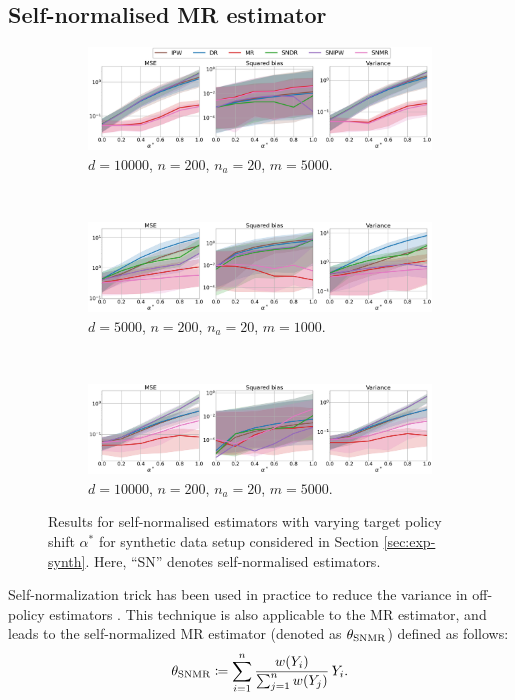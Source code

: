 \subsection{Self-normalised MR estimator}
\begin{figure}[ht]
     \centering
    \begin{subfigure}[b]{0.75\textwidth}
         \centering
         \includegraphics[width=\textwidth]{figures/mr/rebuttal/self-norm1.png}
         \caption{$d=10000$, $n = 200$, $n_a = 20$, $m = 5000$.}
         \label{fig:self-norma}
     \end{subfigure}\\
     \begin{subfigure}[b]{0.75\textwidth}
         \centering
         \includegraphics[width=\textwidth]{figures/mr/rebuttal/self-norm3.png}
         \caption{$d=5000$, $n = 200$, $n_a = 20$, $m=1000$.}
         \label{fig:self-normb}
     \end{subfigure}\\
     \begin{subfigure}[b]{0.75\textwidth}
         \centering
         \includegraphics[width=\textwidth]{figures/mr/rebuttal/self-norm2.png}
         \caption{$d=10000$, $n = 200$, $n_a = 20$, $m=5000$.}
         \label{fig:self-normc}
     \end{subfigure}
     \caption{Results for self-normalised estimators with varying target policy shift $\alpha^\ast$ for synthetic data setup considered in Section \ref{sec:exp-synth}. Here, ``SN'' denotes self-normalised estimators.}
     \label{fig:self-norm}
 \end{figure}
Self-normalization trick has been used in practice to reduce the variance in off-policy estimators \citep{swaminathan2015the}. This technique is also applicable to the MR estimator, and leads to the self-normalized MR estimator (denoted as $\theta_{\textup{SNMR}}$) defined as follows:
\[
\theta_{\textup{SNMR}} \coloneqq \sum_{i=1}^n \frac{w(Y_i)}{\sum_{j=1}^n w(Y_j)}\,Y_i.
\]

